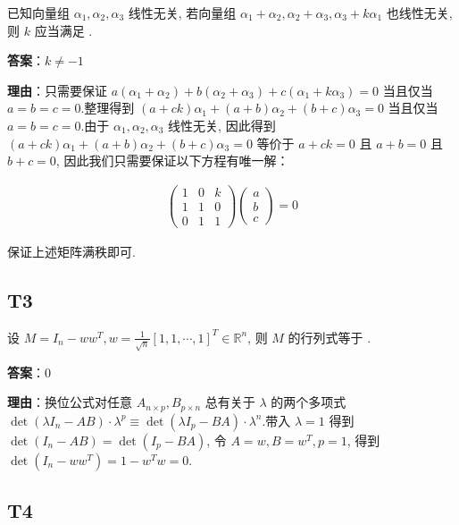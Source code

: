 \documentclass{article}
\begin{document}
\par 已知向量组 $\alpha_1, \alpha_2, \alpha_3$ 线性无关, 若向量组 $\alpha_1+\alpha_2, \alpha_2+\alpha_3, \alpha_3+k\alpha_1$ 也线性无关, 则 $k$ 应当满足 \underline{\phantom{empty\_space}}.

\par \textbf{答案}：$k\neq -1$

\par \textbf{理由}：只需要保证 $a(\alpha_1+\alpha_2) + b(\alpha_2+\alpha_3)+c(\alpha_1+k\alpha_3)=0$ 当且仅当 $a=b=c=0$.整理得到 $(a+ck)\alpha_1 + (a+b)\alpha_2 + (b+c)\alpha_3=0$ 当且仅当 $a=b=c=0$.由于 $\alpha_1, \alpha_2, \alpha_3$ 线性无关, 因此得到 $(a+ck)\alpha_1 + (a+b)\alpha_2 + (b+c)\alpha_3=0$ 等价于 $a+ck=0$ 且 $a+b=0$ 且 $b+c=0$, 因此我们只需要保证以下方程有唯一解：

\begin{align*}
	\begin{pmatrix}
		1 & 0 & k\\
		1 & 1 & 0\\
		0 & 1 & 1
	\end{pmatrix} \begin{pmatrix}
		a\\b\\c
	\end{pmatrix}=0
\end{align*}

保证上述矩阵满秩即可.

\subsection{T3}

\par 设 $M=I_n - ww^T, w=\frac{1}{\sqrt n}[ 1, 1, \cdots, 1]^T \in \mathbb R^n$, 则 $M$ 的行列式等于 \underline{\phantom{empty\_space}}.

\par \textbf{答案}：0

\par \textbf{理由}：换位公式对任意 $A_{n\times p}, B_{p\times n}$ 总有关于 $\lambda$ 的两个多项式 $\det(\lambda I_n - AB) \cdot \lambda^p \equiv \det(\lambda I_p - BA) \cdot \lambda^n $.带入 $\lambda = 1$ 得到 $\det(I_n - AB) = \det(I_p - BA)$,  令 $A=w, B=w^T, p=1$,  得到 $\det(I_n - ww^T)=1 - w^Tw=0$.

\subsection{T4}
\end{document}
